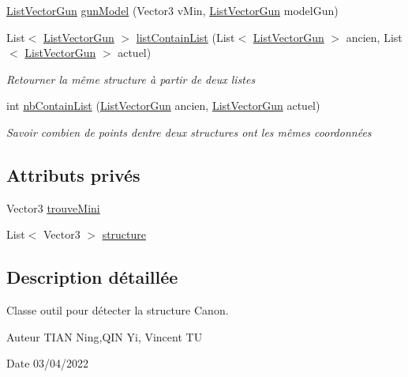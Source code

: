 \begin{DoxyCompactItemize}
\mbox{\hyperlink{class_list_vector_gun}{List\+Vector\+Gun}} \mbox{\hyperlink{class_list_vector_gun_a1c5fc4ed92b846e08616d83971605241}{gun\+Model}} (Vector3 v\+Min, \mbox{\hyperlink{class_list_vector_gun}{List\+Vector\+Gun}} model\+Gun)
\item 
List$<$ \mbox{\hyperlink{class_list_vector_gun}{List\+Vector\+Gun}} $>$ \mbox{\hyperlink{class_list_vector_gun_a73d0b1fca681bce5aaf680873b071827}{list\+Contain\+List}} (List$<$ \mbox{\hyperlink{class_list_vector_gun}{List\+Vector\+Gun}} $>$ ancien, List$<$ \mbox{\hyperlink{class_list_vector_gun}{List\+Vector\+Gun}} $>$ actuel)
\begin{DoxyCompactList}\small\item\em Retourner la même structure à partir de deux listes \end{DoxyCompactList}\item 
int \mbox{\hyperlink{class_list_vector_gun_a23dabaffda742276390b578c091d101a}{nb\+Contain\+List}} (\mbox{\hyperlink{class_list_vector_gun}{List\+Vector\+Gun}} ancien, \mbox{\hyperlink{class_list_vector_gun}{List\+Vector\+Gun}} actuel)
\begin{DoxyCompactList}\small\item\em Savoir combien de points d\textquotesingle{}entre deux structures ont les mêmes coordonnées \end{DoxyCompactList}\end{DoxyCompactItemize}
\subsection*{Attributs privés}
\begin{DoxyCompactItemize}
\item 
Vector3 \mbox{\hyperlink{class_list_vector_gun_af6572c296759eb4bf06e96275ce75c77}{trouve\+Mini}}
\item 
List$<$ Vector3 $>$ \mbox{\hyperlink{class_list_vector_gun_a2cdf82f24fbd46a3705bb6a3887f53c4}{structure}}
\end{DoxyCompactItemize}


\subsection{Description détaillée}
Classe outil pour détecter la structure Canon. 

\begin{DoxyAuthor}{Auteur}
T\+I\+AN Ning,Q\+IN Yi, Vincent TU 
\end{DoxyAuthor}
\begin{DoxyDate}{Date}
03/04/2022 
\end{DoxyDate}


